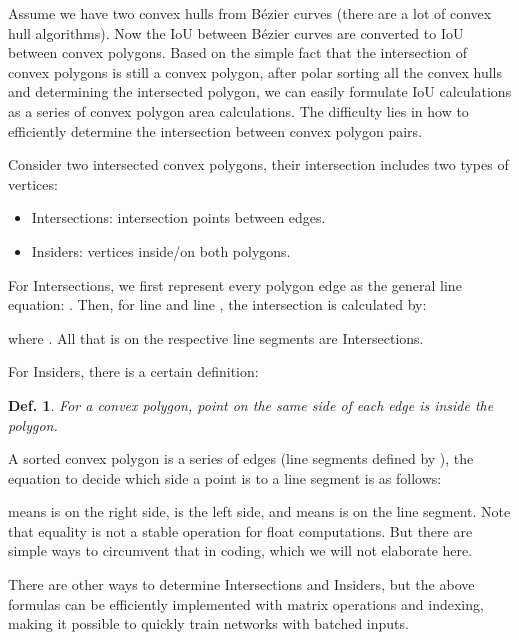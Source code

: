 \documentclass[10pt,twocolumn,letterpaper]{article}
\newtheorem{definition}{Def.}
\begin{document}
Assume we have two convex hulls from Bézier curves (there are a lot of convex hull algorithms).
Now the IoU between Bézier curves are converted to IoU between convex polygons. Based on the simple fact that the intersection of convex polygons is still a convex polygon, after polar sorting all the convex hulls and determining the intersected polygon, we can easily formulate IoU calculations as a series of convex polygon area calculations. The difficulty lies in how to efficiently determine the intersection between convex polygon pairs. 

Consider two intersected convex polygons, their intersection includes two types of vertices:

\begin{itemize}
    \item Intersections: intersection points between edges.
    \item Insiders: vertices inside/on both polygons.
\end{itemize}

For Intersections, we first represent every polygon edge as the general line equation: .
Then, for line  and line ,
the intersection  is calculated by:

\vspace{-3mm}


where . All  that is on the respective line segments are Intersections.

For Insiders, there is a certain definition:

\begin{definition}
For a convex polygon, point  on the same side of each edge is inside the polygon.
\end{definition}

A sorted convex polygon is a series of edges (line segments defined by ), the equation to decide which side a point is to a line segment is as follows:

\vspace{-3mm}



 means  is on the right side,  is the left side, and  means  is on the line segment. Note that equality is not a stable operation for float computations. But there are simple ways to circumvent that in coding, which we will not elaborate here.

There are other ways to determine Intersections and Insiders, but the above formulas can be efficiently implemented with matrix operations and indexing, making it possible to quickly train networks with batched inputs.
\end{document}
